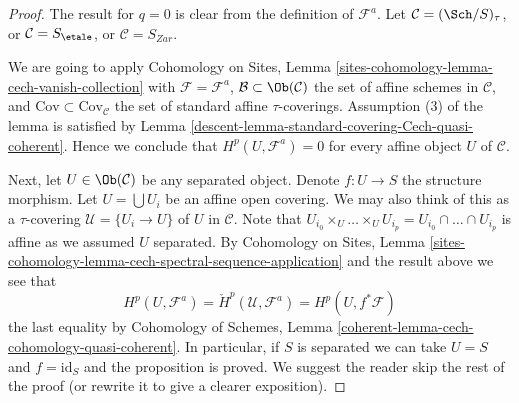 \begin{proof}

The result for $q = 0$ is clear from the definition of $\mathcal{F}^a$.
Let $\mathcal{C} = (\Sch/S)_\tau$, or $\mathcal{C} = S_\etale$,
or $\mathcal{C} = S_{Zar}$.

\medskip\noindent
We are going to apply
Cohomology on Sites,
Lemma \ref{sites-cohomology-lemma-cech-vanish-collection}
with $\mathcal{F} = \mathcal{F}^a$,
$\mathcal{B} \subset \Ob(\mathcal{C})$ the set of affine schemes
in $\mathcal{C}$, and $\text{Cov} \subset \text{Cov}_\mathcal{C}$ the
set of standard affine $\tau$-coverings. Assumption (3) of
the lemma is satisfied by
Lemma \ref{descent-lemma-standard-covering-Cech-quasi-coherent}.
Hence we conclude that $H^p(U, \mathcal{F}^a) = 0$ for every
affine object $U$ of $\mathcal{C}$.

\medskip\noindent
Next, let $U \in \Ob(\mathcal{C})$ be any separated object.
Denote $f : U \to S$ the structure morphism.
Let $U = \bigcup U_i$ be an affine open covering.
We may also think of this as a $\tau$-covering
$\mathcal{U} = \{U_i \to U\}$ of $U$ in $\mathcal{C}$.
Note that
$U_{i_0} \times_U \ldots \times_U U_{i_p} =
U_{i_0} \cap \ldots \cap U_{i_p}$ is affine as we assumed $U$ separated.
By
Cohomology on Sites, Lemma
\ref{sites-cohomology-lemma-cech-spectral-sequence-application}
and the result above we see that
$$
H^p(U, \mathcal{F}^a) = \check{H}^p(\mathcal{U}, \mathcal{F}^a)
= H^p(U, f^*\mathcal{F})
$$
the last equality by
Cohomology of Schemes, Lemma
\ref{coherent-lemma-cech-cohomology-quasi-coherent}.
In particular, if $S$ is separated we can take $U = S$ and
$f = \text{id}_S$ and the proposition is proved.
We suggest the reader skip the rest of the proof (or rewrite it
to give a clearer exposition).


\end{proof}
